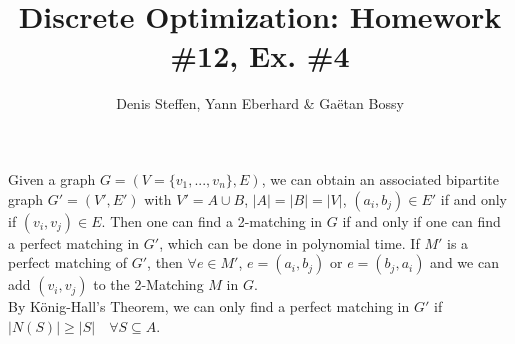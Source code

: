 \documentclass[a4paper,11pt,french]{article}
\title{Discrete Optimization: Homework \#12, Ex. \#4}
\author{Denis Steffen, Yann Eberhard \& Gaëtan Bossy}
\begin{document}
    
    \maketitle
Given a graph $G=(V=\{v_1,...,v_n\},E)$, we can obtain an associated bipartite graph $G'=(V',E')$ with $V'=A\cup B$, $|A|=|B|=|V|$, $(a_i,b_j)\in E'$ if and only if $(v_i,v_j)\in E$. Then one can find a 2-matching in $G$ if and only if one can find a perfect matching in $G'$, which can be done in polynomial time. If $M'$ is a perfect matching of $G'$, then $\forall e\in M'$, $e=(a_i,b_j)$ or $e=(b_j,a_i)$ and we can add $(v_i,v_j)$ to the 2-Matching $M$ in $G$.\\

By König-Hall's Theorem, we can only find a perfect matching in $G'$ if $|N(S)|\geq|S|\quad \forall S\subseteq A$.
\end{document}
